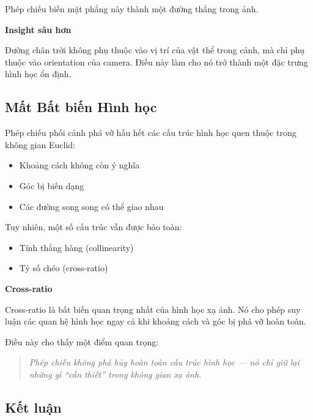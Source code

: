 Phép chiếu biến mặt phẳng này thành một đường thẳng trong ảnh.

\begin{mdframed}[style=infobox]
	\textbf{Insight sâu hơn}
	
	Đường chân trời không phụ thuộc vào vị trí của vật thể trong cảnh, mà chỉ phụ thuộc vào orientation của camera. Điều này làm cho nó trở thành một đặc trưng hình học ổn định.
\end{mdframed}

\subsection{Mất Bất biến Hình học}
\label{subsec:loss_of_invariants}

Phép chiếu phối cảnh phá vỡ hầu hết các cấu trúc hình học quen thuộc trong không gian Euclid:

\begin{itemize}
	\item Khoảng cách không còn ý nghĩa
	\item Góc bị biến dạng
	\item Các đường song song có thể giao nhau
\end{itemize}

Tuy nhiên, một số cấu trúc vẫn được bảo toàn:

\begin{itemize}
	\item Tính thẳng hàng (collinearity)
	\item Tỷ số chéo (cross-ratio)
\end{itemize}

\begin{mdframed}[style=infobox]
	\textbf{Cross-ratio}
	
	Cross-ratio là bất biến quan trọng nhất của hình học xạ ảnh. Nó cho phép suy luận các quan hệ hình học ngay cả khi khoảng cách và góc bị phá vỡ hoàn toàn.
\end{mdframed}

Điều này cho thấy một điểm quan trọng:

\begin{quote}
	\textit{Phép chiếu không phá hủy hoàn toàn cấu trúc hình học — nó chỉ giữ lại những gì “cần thiết” trong không gian xạ ảnh.}
\end{quote}

\subsection*{Kết luận}
\label{subsec:perspective_conclusion}

